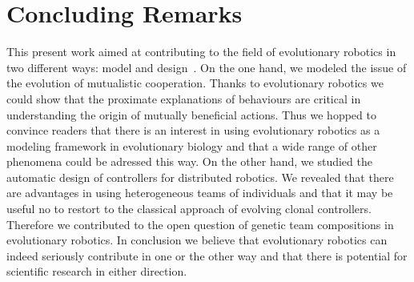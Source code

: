 

\section{Concluding Remarks}

	This present work aimed at contributing to the field of evolutionary robotics in two different ways: model and design~\parencite{Trianni2014b, Doncieux2015a}. On the one hand, we modeled the issue of the evolution of mutualistic cooperation. Thanks to evolutionary robotics we could show that the proximate explanations of behaviours are critical in understanding the origin of mutually beneficial actions. Thus we hopped to convince readers that there is an interest in using evolutionary robotics as a modeling framework in evolutionary biology and that a wide range of other phenomena could be adressed this way. On the other hand, we studied the automatic design of controllers for distributed robotics. We revealed that there are advantages in using heterogeneous teams of individuals and that it may be useful no to restort to the classical approach of evolving clonal controllers. Therefore we contributed to the open question of genetic team compositions in evolutionary robotics. In conclusion we believe that evolutionary robotics can indeed seriously contribute in one or the other way and that there is potential for scientific research in either direction.
